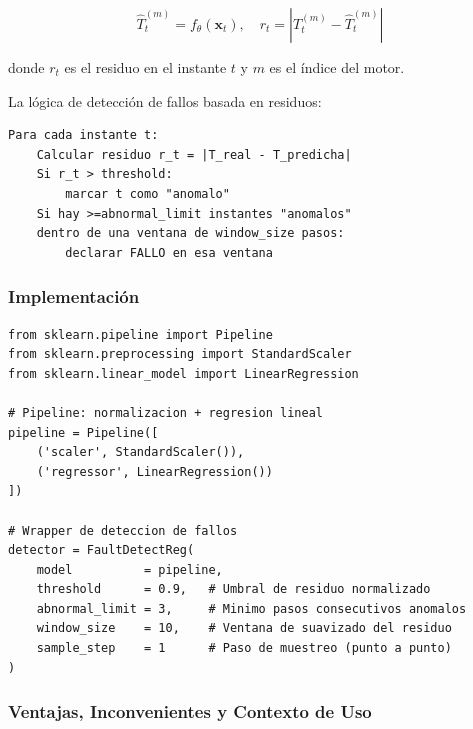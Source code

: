 \documentclass[12pt,a4paper]{article}
\begin{document}
\begin{equation}
  \hat{T}^{(m)}_t = f_{\theta}(\mathbf{x}_t), \quad
  r_t = |T^{(m)}_t - \hat{T}^{(m)}_t|
\end{equation}

donde $r_t$ es el residuo en el instante $t$ y $m$ es el \'{i}ndice del motor.

La l\'{o}gica de detecci\'{o}n de fallos basada en residuos:

\begin{center}
\begin{verbatim}
Para cada instante t:
    Calcular residuo r_t = |T_real - T_predicha|
    Si r_t > threshold:
        marcar t como "anomalo"
    Si hay >=abnormal_limit instantes "anomalos"
    dentro de una ventana de window_size pasos:
        declarar FALLO en esa ventana
\end{verbatim}
\end{center}

\subsubsection{Implementaci\'{o}n}

\begin{lstlisting}[caption={Configuraci\'{o}n del detector AAKR}]
from sklearn.pipeline import Pipeline
from sklearn.preprocessing import StandardScaler
from sklearn.linear_model import LinearRegression

# Pipeline: normalizacion + regresion lineal
pipeline = Pipeline([
    ('scaler', StandardScaler()),
    ('regressor', LinearRegression())
])

# Wrapper de deteccion de fallos
detector = FaultDetectReg(
    model          = pipeline,
    threshold      = 0.9,   # Umbral de residuo normalizado
    abnormal_limit = 3,     # Minimo pasos consecutivos anomalos
    window_size    = 10,    # Ventana de suavizado del residuo
    sample_step    = 1      # Paso de muestreo (punto a punto)
)
\end{lstlisting}

\subsubsection{Ventajas, Inconvenientes y Contexto de Uso}
\end{document}
